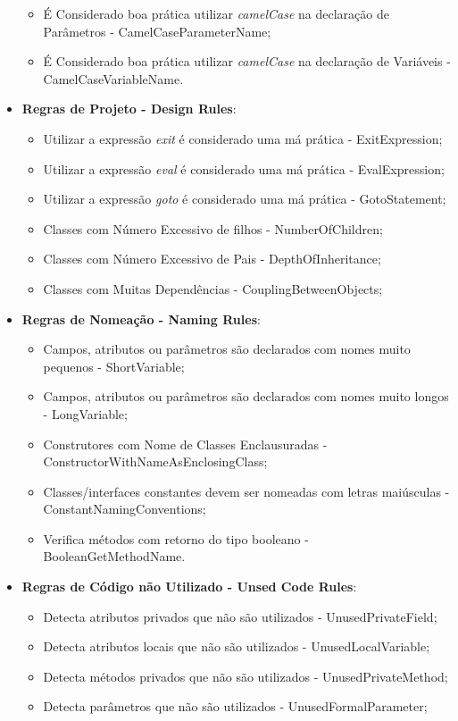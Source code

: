 \begin{itemize}
\begin{itemize}
			\item É Considerado boa prática utilizar \textit{camelCase} na declaração
            de Parâmetros - CamelCaseParameterName;
			\item É Considerado boa prática utilizar \textit{camelCase} na declaração
            de Variáveis - CamelCaseVariableName.
		\end{itemize}
  \item \textbf{Regras de Projeto - Design Rules}:
		\begin{itemize}
			\item Utilizar a expressão \textit{exit} é considerado uma má prática - ExitExpression;
			\item Utilizar a expressão \textit{eval} é considerado uma má prática - EvalExpression;
			\item Utilizar a expressão \textit{goto} é considerado uma má prática - GotoStatement;
			\item Classes com Número Excessivo de filhos - NumberOfChildren;
			\item Classes com Número Excessivo de Pais - DepthOfInheritance;
			\item Classes com Muitas Dependências - CouplingBetweenObjects;
		\end{itemize}
  \item \textbf{Regras de Nomeação - Naming Rules}:
		\begin{itemize}
			\item Campos, atributos ou parâmetros são declarados com nomes muito
            pequenos - ShortVariable;
			\item Campos, atributos ou parâmetros são declarados com nomes muito
            longos - LongVariable;
      \item Construtores com Nome de Classes Enclausuradas -
            ConstructorWithNameAsEnclosingClass;
      \item Classes/interfaces constantes devem ser nomeadas com letras
            maiúsculas - ConstantNamingConventions;
      \item Verifica métodos com retorno do tipo booleano - BooleanGetMethodName.
		\end{itemize}
  \item \textbf{Regras de Código não Utilizado - Unsed Code Rules}:
    \begin{itemize}
      \item Detecta atributos privados que não são utilizados - UnusedPrivateField;
      \item Detecta atributos locais que não são utilizados - UnusedLocalVariable;
      \item Detecta métodos privados que não são utilizados - UnusedPrivateMethod;
      \item Detecta parâmetros que não são utilizados - UnusedFormalParameter;
    \end{itemize}
\end{itemize}

